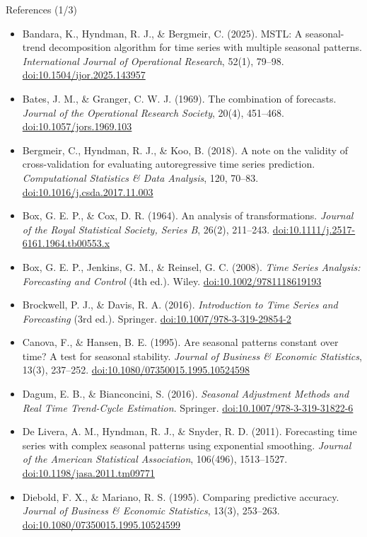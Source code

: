 \begin{frame}{References (1/3)}
\itemsize{\scriptsize}
\begin{itemize}
    \item Bandara, K., Hyndman, R. J., \& Bergmeir, C. (2025). MSTL: A seasonal-trend decomposition algorithm for time series with multiple seasonal patterns. \textit{International Journal of Operational Research}, 52(1), 79--98. \href{https://doi.org/10.1504/ijor.2025.143957}{doi:10.1504/ijor.2025.143957}
    \item Bates, J. M., \& Granger, C. W. J. (1969). The combination of forecasts. \textit{Journal of the Operational Research Society}, 20(4), 451--468. \href{https://doi.org/10.1057/jors.1969.103}{doi:10.1057/jors.1969.103}
    \item Bergmeir, C., Hyndman, R. J., \& Koo, B. (2018). A note on the validity of cross-validation for evaluating autoregressive time series prediction. \textit{Computational Statistics \& Data Analysis}, 120, 70--83. \href{https://doi.org/10.1016/j.csda.2017.11.003}{doi:10.1016/j.csda.2017.11.003}
    \item Box, G. E. P., \& Cox, D. R. (1964). An analysis of transformations. \textit{Journal of the Royal Statistical Society, Series B}, 26(2), 211--243. \href{https://doi.org/10.1111/j.2517-6161.1964.tb00553.x}{doi:10.1111/j.2517-6161.1964.tb00553.x}
    \item Box, G. E. P., Jenkins, G. M., \& Reinsel, G. C. (2008). \textit{Time Series Analysis: Forecasting and Control} (4th ed.). Wiley. \href{https://doi.org/10.1002/9781118619193}{doi:10.1002/9781118619193}
    \item Brockwell, P. J., \& Davis, R. A. (2016). \textit{Introduction to Time Series and Forecasting} (3rd ed.). Springer. \href{https://doi.org/10.1007/978-3-319-29854-2}{doi:10.1007/978-3-319-29854-2}
    \item Canova, F., \& Hansen, B. E. (1995). Are seasonal patterns constant over time? A test for seasonal stability. \textit{Journal of Business \& Economic Statistics}, 13(3), 237--252. \href{https://doi.org/10.1080/07350015.1995.10524598}{doi:10.1080/07350015.1995.10524598}
    \item Dagum, E. B., \& Bianconcini, S. (2016). \textit{Seasonal Adjustment Methods and Real Time Trend-Cycle Estimation}. Springer. \href{https://doi.org/10.1007/978-3-319-31822-6}{doi:10.1007/978-3-319-31822-6}
    \item De Livera, A. M., Hyndman, R. J., \& Snyder, R. D. (2011). Forecasting time series with complex seasonal patterns using exponential smoothing. \textit{Journal of the American Statistical Association}, 106(496), 1513--1527. \href{https://doi.org/10.1198/jasa.2011.tm09771}{doi:10.1198/jasa.2011.tm09771}
    \item Diebold, F. X., \& Mariano, R. S. (1995). Comparing predictive accuracy. \textit{Journal of Business \& Economic Statistics}, 13(3), 253--263. \href{https://doi.org/10.1080/07350015.1995.10524599}{doi:10.1080/07350015.1995.10524599}
\end{itemize}
\end{frame}

